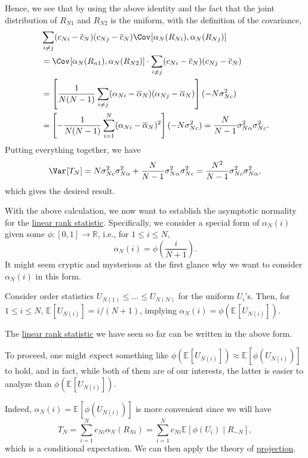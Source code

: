\begin{explanation}
	Hence, we see that by using the above identity and the fact that the joint distribution of \(R_{N1}\) and \(R_{N2}\) is the uniform, with the definition of the covariance,
	\begin{align*}
		 & \sum_{i \neq j} (c_{Ni} - \overline{c} _N)(c_{Nj} - \overline{c} _N) \Cov_{}[\alpha _N(R_{Ni}) , \alpha _N(R_{Nj})]                                \\
		 & = \Cov_{}[\alpha _N(R_{n1}), \alpha _N(R_{N2})] \cdot \sum_{i \neq j} (c_{Ni} - \overline{c} _N)(c_{Nj} - \overline{c} _N)                         \\
		 & = \left[ \frac{1}{N(N-1)} \sum_{i \neq j} (\alpha _{Ni} - \overline{\alpha} _N) (\alpha _{Nj} - \overline{\alpha} _N) \right] (- N \sigma _{Nc}^2) \\
		 & = \left[ - \frac{1}{N(N-1)} \sum_{i=1}^{N} (\alpha _{Ni} - \overline{\alpha} _N)^2 \right] (- N \sigma _{Nc}^2)
		= \frac{N}{N-1} \sigma _{N \alpha }^2 \sigma _{Nc}^2 .
	\end{align*}
	Putting everything together, we have
	\[
		\Var_{}[T_N]
		= N \sigma _{Nc}^2 \sigma _{N \alpha }^2 + \frac{N}{N-1} \sigma _{N \alpha }^2 \sigma _{Nc}^2
		= \frac{N^2}{N-1}\sigma _{Nc}^2 \sigma _{N \alpha }^2,
	\]
	which gives the desired result.
\end{explanation}

With the above calculation, we now want to establish the asymptotic normality for the \hyperref[def:linrea-rank-statistic]{linear rank statistic}. Specifically, we consider a special form of \(\alpha _N(i)\) given some \(\phi \colon [0, 1] \to \mathbb{R} \), i.e., for \(1 \leq i \leq N\),
\[
	\alpha _N(i) = \phi \left( \frac{i}{N+1} \right) .
\]
It might seem cryptic and mysterious at the first glance why we want to consider \(\alpha _N(i)\) in this form.

\begin{intuition}
	Consider order statistics \(U_{N(1)} \leq \dots \leq U_{N(N)}\) for the uniform \(U_i\)'s. Then, for \(1 \leq i \leq N\), \(\mathbb{E}_{}[U_{N(i)}] = i / (N+1)\), implying \(\alpha _N(i) = \phi (\mathbb{E}_{}[U_{N(i)}] )\).
\end{intuition}

\begin{eg}
	The \hyperref[def:linrea-rank-statistic]{linear rank statistic} we have seen so far can be written in the above form.
\end{eg}

To proceed, one might expect something like \(\phi (\mathbb{E}_{}[U_{N(i)}] ) \approx \mathbb{E}_{}[\phi (U_{N(i)})] \) to hold, and in fact, while both of them are of our interests, the latter is easier to analyze than \(\phi (\mathbb{E}_{}[U_{N(i)}] )\).

\begin{intuition}
	Indeed, \(\alpha _N(i) = \mathbb{E}_{}[\phi (U_{N(i)})]\) is more convenient since we will have
	\[
		T_N
		= \sum_{i=1}^{N} c_{Ni} \alpha _N(R_{Ni})
		= \sum_{i=1}^{N} c_{Ni} \mathbb{E}_{}[\phi (U_i) \mid R_{\sim N}] ,
	\]
	which is a conditional expectation. We can then apply the theory of \hyperref[def:projection]{projection}.
\end{intuition}